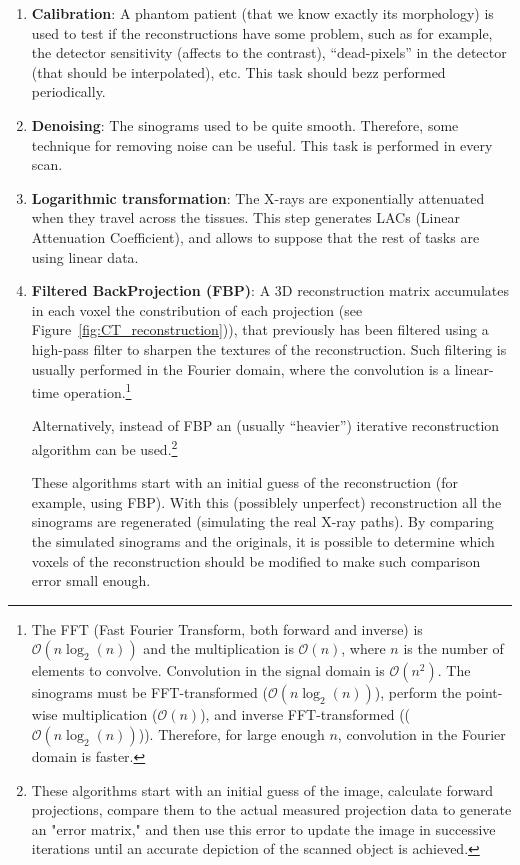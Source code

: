\begin{enumerate}
\item \textbf{Calibration}: A phantom patient (that we know exactly
  its morphology) is used to test if the reconstructions have some
  problem, such as for example, the detector sensitivity (affects to
  the contrast), ``dead-pixels'' in the detector (that should be
  interpolated), etc. This task should bezz performed periodically.
\item \textbf{Denoising}: The sinograms used to be quite
  smooth. Therefore, some technique for removing noise can be
  useful. This task is performed in every scan.
\item \textbf{Logarithmic transformation}: The X-rays are
  exponentially attenuated when they travel across the tissues. This
  step generates LACs (Linear Attenuation Coefficient), and allows to
  suppose that the rest of tasks are using linear data.
\item \textbf{Filtered BackProjection (FBP)}: A 3D reconstruction
  matrix accumulates in each voxel the constribution of each
  projection \cite{abdulla2025acquiring2} (see
  Figure~\ref{fig:CT_reconstruction})), that previously has been
  filtered using a high-pass filter to sharpen the textures of the
  reconstruction. Such filtering is usually performed in the Fourier
  domain, where the convolution is a linear-time
  operation.\footnote{The FFT (Fast Fourier Transform, both forward
    and inverse) is $\mathcal{O}(n\log_2(n))$ and the multiplication
    is $\mathcal{O}(n)$, where $n$ is the number of elements to
    convolve. Convolution in the signal domain is
    $\mathcal{O}(n^2)$. The sinograms must be FFT-transformed
    ($\mathcal{O}(n\log_2(n))$), perform the point-wise multiplication
    ($\mathcal{O}(n)$), and inverse FFT-transformed
    (($\mathcal{O}(n\log_2(n))$)). Therefore, for large enough $n$,
    convolution in the Fourier domain is faster.}

  Alternatively, instead of FBP an (usually ``heavier'') iterative
  reconstruction algorithm can be used.\footnote{These algorithms
    start with an initial guess of the image, calculate forward
    projections, compare them to the actual measured projection data
    to generate an "error matrix," and then use this error to update
    the image in successive iterations until an accurate depiction of
    the scanned object is achieved.}
  
  These algorithms start with an initial guess of the reconstruction
  (for example, using FBP). With this (possiblely unperfect)
  reconstruction all the sinograms are regenerated (simulating the
  real X-ray paths). By comparing the simulated sinograms and the
  originals, it is possible to determine which voxels of the
  reconstruction should be modified to make such comparison error
  small enough.

\end{enumerate}

